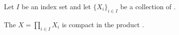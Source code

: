 \begin{theorem} \label{theorem:tychonoffs_theorem_for_the_compactness_of_a_small_product_of_compact_topological_spaces}
Let $I$ be an index set and let $\{X_i\}_{i \in I}$ be a collection of . 

The  $X = \prod_{i \in I} X_i$ is compact in the product .
\end{theorem}